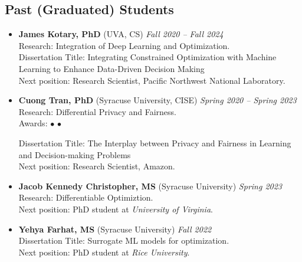 \subsection*{Past (Graduated) Students}
\begin{itemize}
  \item \textbf{James Kotary, PhD} ({\sc UVA}, CS) 
  \hfill{\em Fall 2020 -- Fall 2024}\\
  {\sc Research}: Integration of Deep Learning and Optimization.\\
  {\sc Dissertation Title}: Integrating Constrained Optimization with Machine Learning to Enhance Data-Driven Decision Making\\
  {\sc Next position:} Research Scientist, Pacific Northwest National Laboratory.

  \item \textbf{Cuong Tran, PhD} ({\sc Syracuse University}, CISE) 
  \hfill{\em Spring 2020 -- Spring 2023}\\
  {\sc Research}: Differential Privacy and Fairness.\\
  {\sc Awards:} 
  $\bullet$  
  $\bullet$  

  {\sc Dissertation Title:} The Interplay between Privacy and Fairness in
  Learning and Decision-making Problems\\
  {\sc Next position:} Research Scientist, Amazon.

  \item \textbf{Jacob Kennedy Christopher, MS} ({\sc  Syracuse University}) \hfill{\em Spring 2023}\\
  {\sc Research:} Differentiable Optimiztion.\\
  {\sc Next position:} PhD student at \textit{University of Virginia}.

  \item \textbf{Yehya Farhat, MS} ({\sc Syracuse University}) \hfill{\em Fall 2022}\\
  {\sc Dissertation Title:} Surrogate ML models for optimization.\\
  {\sc Next position:} PhD student at \textit{Rice University}.

\end{itemize}

